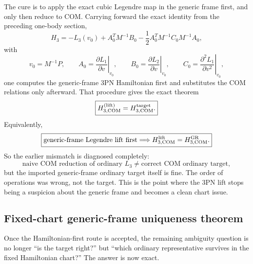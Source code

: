 \documentclass[11pt]{article}
\begin{document}
The cure is to apply the exact cubic Legendre map in the generic frame first,
and only then reduce to COM.  Carrying forward the exact identity from the
preceding one-body section,
\[
H_3=-L_3(v_0)+A_0^TM^{-1}B_0-\frac12A_0^TM^{-1}C_0M^{-1}A_0,
\]
with
\[
v_0=M^{-1}P,
\qquad
A_0=\left.\frac{\partial L_1}{\partial v}\right|_{v_0},
\qquad
B_0=\left.\frac{\partial L_2}{\partial v}\right|_{v_0},
\qquad
C_0=\left.\frac{\partial^2L_1}{\partial v^2}\right|_{v_0},
\]
one computes the generic-frame $3$PN Hamiltonian first and substitutes the COM
relations only afterward.  That procedure gives the exact theorem
\[
\boxed{H_{3,\rm COM}^{\rm(lift)}=H_{3,\rm COM}^{\rm target}.}
\]
Equivalently,
\[
\boxed{
\text{generic-frame Legendre lift first}
\Longrightarrow
H_{3,\rm COM}^{\rm lift}=H_{3,\rm COM}^{\rm GR}.}
\]
So the earlier mismatch is diagnosed completely:
\[
\text{naive COM reduction of ordinary }L_3\neq\text{correct COM ordinary target},
\]
but the imported generic-frame ordinary target itself is fine.  The order of
operations was wrong, not the target.  This is the point where the $3$PN lift
stops being a suspicion about the generic frame and becomes a clean chart issue.

\subsection{Fixed-chart generic-frame uniqueness theorem}
\label{sec:compmass-uniqueness}

Once the Hamiltonian-first route is accepted, the remaining ambiguity question is
no longer ``is the target right?'' but ``which ordinary representative survives
in the fixed Hamiltonian chart?''  The answer is now exact.
\end{document}
